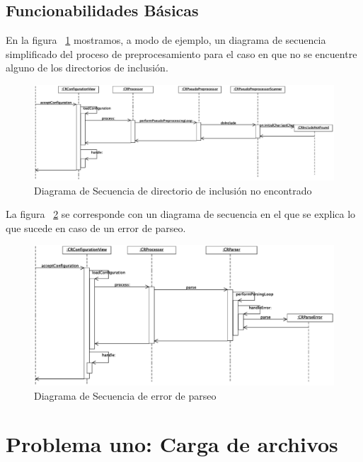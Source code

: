 \documentclass[a4paper,oneside,12pt]{article}
\begin{document}
\subsection{Funcionabilidades B\'asicas}

En la figura ~\ref{diagrama_de_secuencia_include_not_found} mostramos, a modo de ejemplo, un diagrama de secuencia simplificado del proceso de preprocesamiento para el caso en que no se encuentre alguno de los directorios de inclusión.

\begin{figure}[htbp]
  \centering
  \includegraphics[scale=0.40, angle=270]{images/secuencia_include_not_found.eps}
  \caption{Diagrama de Secuencia de directorio de inclusión no encontrado}
  \label{diagrama_de_secuencia_include_not_found}
\end{figure}

La figura ~\ref{diagrama_de_secuencia_parser_error} se corresponde con un diagrama de secuencia en el que se explica lo que sucede en caso de un error de parseo.

\begin{figure}[htbp]
  \centering
  \includegraphics[scale=0.40, angle=270]{images/secuencia_parser_error.eps}
  \caption{Diagrama de Secuencia de error de parseo}
  \label{diagrama_de_secuencia_parser_error}
\end{figure}

\clearpage

\section{Problema uno: Carga de archivos}
\label{sec:problema_uno}
\end{document}
